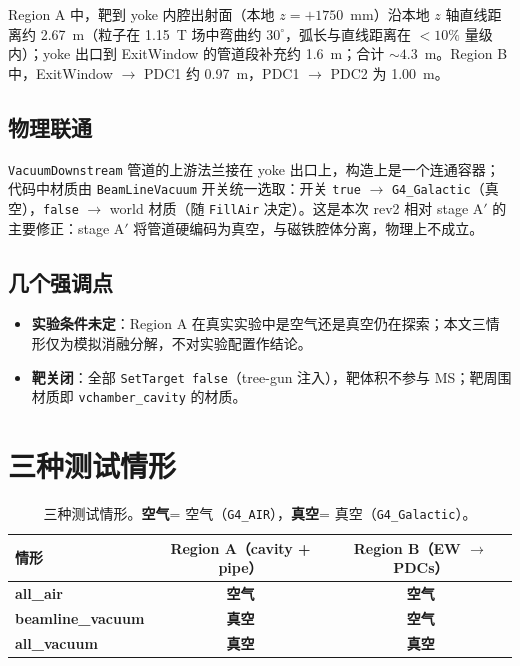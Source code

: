 \documentclass[a4paper, 11pt]{article}
\newcommand{\air}{\textcolor{airorange}{\textbf{空气}}}
\newcommand{\vac}{\textcolor{vacblue}{\textbf{真空}}}
\begin{document}
Region A 中，靶到 yoke 内腔出射面（本地 $z=+1750$~mm）沿本地 $z$ 轴直线距离约 2.67~m（粒子在 1.15~T 场中弯曲约 $30^\circ$，弧长与直线距离在 $<10\%$ 量级内）；yoke 出口到 ExitWindow 的管道段补充约 1.6~m；合计 $\sim 4.3$~m。Region B 中，ExitWindow $\to$ PDC1 约 0.97~m，PDC1 $\to$ PDC2 为 1.00~m。

\subsection{物理联通}

\texttt{VacuumDownstream} 管道的上游法兰接在 yoke 出口上，构造上是一个连通容器；代码中材质由 \texttt{BeamLineVacuum} 开关统一选取：开关 \texttt{true} $\to$ \texttt{G4\_Galactic}（真空），\texttt{false} $\to$ world 材质（随 \texttt{FillAir} 决定）。这是本次 rev2 相对 stage A$'$ 的主要修正：stage A$'$ 将管道硬编码为真空，与磁铁腔体分离，物理上不成立。

\subsection{几个强调点}

\begin{itemize}[nosep]
  \item \textbf{实验条件未定}：Region A 在真实实验中是空气还是真空仍在探索；本文三情形仅为模拟消融分解，不对实验配置作结论。
  \item \textbf{靶关闭}：全部 \texttt{SetTarget false}（tree-gun 注入），靶体积不参与 MS；靶周围材质即 \texttt{vchamber\_cavity} 的材质。
\end{itemize}

\section{三种测试情形}

\begin{table}[H]
\centering
\caption{三种测试情形。\air = 空气（\texttt{G4\_AIR}），\vac = 真空（\texttt{G4\_Galactic}）。}
\label{tab:conditions}
\begin{tabular}{lcc}
\toprule
情形 & Region A（cavity + pipe） & Region B（EW $\to$ PDCs） \\
\midrule
\textbf{all\_air}          & \air & \air \\
\textbf{beamline\_vacuum}  & \vac & \air \\
\textbf{all\_vacuum}       & \vac & \vac \\
\bottomrule
\end{tabular}
\end{table}
\end{document}
